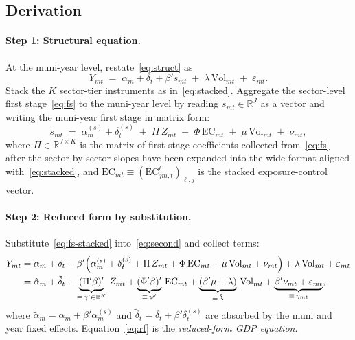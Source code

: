 \documentclass{article}
\newcommand{\EC}{\mathrm{EC}}
\newcommand{\Vol}{\mathrm{Vol}}
\theoremstyle{plain}
\theoremstyle{definition}
\theoremstyle{remark}
\begin{document}
\subsection{Derivation}

\paragraph{Step 1: Structural equation.}
At the muni-year level, restate~\eqref{eq:struct} as
\begin{equation}\label{eq:second}
  Y_{mt}
  \;=\;
  \alpha_m + \delta_t + \beta' s_{mt}
  \;+\;
  \lambda\,\Vol_{mt}
  \;+\;
  \varepsilon_{mt}.
\end{equation}
Stack the $K$ sector-tier instruments as in~\eqref{eq:stacked}. Aggregate the
sector-level first stage~\eqref{eq:fs} to the muni-year level by reading
$s_{mt}\in\mathbb{R}^J$ as a vector and writing the muni-year first stage in
matrix form:
\begin{equation}\label{eq:fs-stacked}
  s_{mt}
  \;=\;
  \alpha^{(s)}_m + \delta^{(s)}_t
  \;+\;
  \Pi\, Z_{mt}
  \;+\;
  \Phi\, \EC_{mt}
  \;+\;
  \mu\,\Vol_{mt}
  \;+\;
  \nu_{mt},
\end{equation}
where $\Pi\in\mathbb{R}^{J\times K}$ is the matrix of first-stage coefficients
collected from~\eqref{eq:fs} after the sector-by-sector slopes have been
expanded into the wide format aligned with~\eqref{eq:stacked}, and
$\EC_{mt}\equiv(\EC^{\ell}_{jm,t})_{\ell,j}$ is the stacked exposure-control
vector.

\paragraph{Step 2: Reduced form by substitution.}
Substitute~\eqref{eq:fs-stacked} into~\eqref{eq:second} and collect terms:
\begin{align}
  Y_{mt}
  &= \alpha_m + \delta_t + \beta'\!\left(\alpha^{(s)}_m + \delta^{(s)}_t
       + \Pi\, Z_{mt} + \Phi\,\EC_{mt} + \mu\,\Vol_{mt} + \nu_{mt}\right)
       + \lambda\,\Vol_{mt} + \varepsilon_{mt} \notag \\
  &= \tilde\alpha_m + \tilde\delta_t
       + \underbrace{(\Pi'\beta)'}_{\equiv\,\gamma'\in\mathbb{R}^K}\, Z_{mt}
       + \underbrace{(\Phi'\beta)'}_{\equiv\,\psi'}\, \EC_{mt}
       + \underbrace{(\beta'\mu+\lambda)}_{\equiv\,\tilde\lambda}\,\Vol_{mt}
       + \underbrace{\beta'\nu_{mt}+\varepsilon_{mt}}_{\equiv\,\eta_{mt}},
       \label{eq:rf}
\end{align}
where $\tilde\alpha_m=\alpha_m+\beta'\alpha^{(s)}_m$ and
$\tilde\delta_t=\delta_t+\beta'\delta^{(s)}_t$ are absorbed by the
muni and year fixed effects. Equation~\eqref{eq:rf} is the
\emph{reduced-form GDP equation}.
\end{document}
